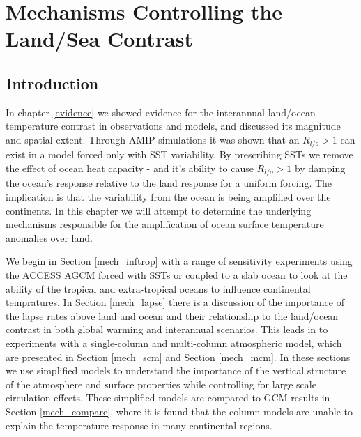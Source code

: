 \chapter{Mechanisms Controlling the Land/Sea Contrast} 


\label{mechanisms} 


\section{Introduction}
In chapter \ref{evidence} we showed evidence for the interannual land/ocean 
temperature contrast in observations and models, and discussed its magnitude and 
spatial extent. Through AMIP simulations it was shown that an $R_{l/o}>1$ can 
exist in a model forced only with SST variability. By prescribing SSTs we remove 
the effect of ocean heat capacity - and it's ability to cause $R_{l/o}>1$ by 
damping the ocean's response relative to the land response for a uniform 
forcing. The implication is that the variability from the ocean is being 
amplified over the continents. In this chapter we will attempt to determine the 
underlying mechanisms responsible for the amplification of ocean surface 
temperature anomalies over land. 

We begin in Section \ref{mech_inftrop} with a range of sensitivity experiments 
using the ACCESS AGCM forced with SSTs or coupled to a slab ocean to look at the 
ability of the tropical and extra-tropical oceans to influence continental 
tempratures. In Section \ref{mech_lapse} there is a discussion of the importance 
of the lapse rates above land and ocean and their relationship to the land/ocean 
contrast in both global warming and interannual scenarios. This leads in to 
experiments with a single-column and multi-column atmospheric model, which are 
presented in Section \ref{mech_scm} and Section \ref{mech_mcm}. In these 
sections we use simplified models to understand the importance of the vertical 
structure of the atmosphere and surface properties while controlling for large 
scale circulation effects. These simplified models are compared to GCM results 
in Section \ref{mech_compare}, where it is found that the column models are 
unable to explain the temperature response in many continental regions.

